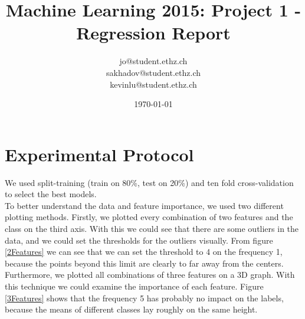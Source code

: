 \documentclass[a4paper, 11pt]{article}
\title{Machine Learning 2015: Project 1 - Regression Report}
\author{jo@student.ethz.ch\\ sakhadov@student.ethz.ch\\ kevinlu@student.ethz.ch\\}
\date{\today}
\begin{document}
\maketitle

\section*{Experimental Protocol}
We used split-training (train on 80\%, test on 20\%) and ten fold cross-validation to select the best models. \\
To better understand the data and feature importance, we used two different plotting methods. Firstly, we plotted every combination of two features and the class on the third axis. With this we could see that there are some outliers in the data, and we could set the thresholds for the outliers visually. From figure \ref{2Features} we can see that we can set the threshold to 4 on the frequency 1, because the points beyond this limit are clearly to far away from the centers.\\ 
Furthermore, we plotted all combinations of three features on a 3D graph. With this technique we could examine the importance of each feature. Figure \ref{3Features} shows that the frequency 5 has probably no impact on the labels, because the means of different classes lay roughly on the same height.
\end{document}
